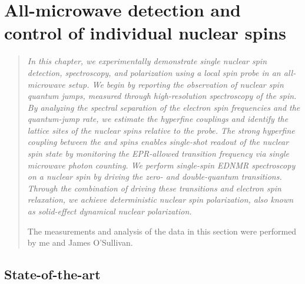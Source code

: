 \setchapterpreamble[u]{\margintoc}

\chapter{All-microwave detection and control of individual \W nuclear spins}
\label{ch:detection_and_control_of_individual_w}


\begin{quote}
\itshape
In this chapter, we experimentally demonstrate single \W nuclear spin detection, spectroscopy, and polarization using a local \Er spin probe in an all-microwave setup. We begin by reporting the observation of nuclear spin quantum jumps, measured through high-resolution spectroscopy of the \Er spin. By analyzing the spectral separation of the electron spin frequencies and the quantum-jump rate, we estimate the hyperfine couplings and identify the lattice sites of the \W nuclear spins relative to the \Er probe. The strong hyperfine coupling between the \Er and \W spins enables single-shot readout of the nuclear spin state by monitoring the EPR-allowed transition frequency via single microwave photon counting. We perform single-spin EDNMR spectroscopy on a \W nuclear spin by driving the zero- and double-quantum transitions. Through the combination of driving these transitions and electron spin relaxation, we achieve deterministic nuclear spin polarization, also known as solid-effect dynamical nuclear polarization.

The measurements and analysis of the data in this section were performed by me and James O'Sullivan.
\end{quote}


\section{State-of-the-art}



